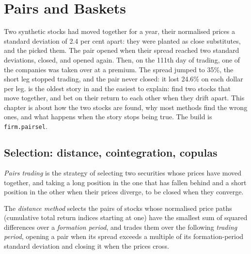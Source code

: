 \chapter{Pairs and Baskets}\label{ch:s1:pairs-and-baskets}

Two synthetic stocks had moved together for a year, their normalised prices a standard deviation of 2.4 per cent apart: they were planted as close
substitutes, and the  picked them. The pair opened when their spread reached two standard deviations, closed, and opened again. Then, on the 111th day of trading, one of the companies was taken over at a premium. The spread jumped to 35\%, the short leg stopped trading, and the pair
never closed: it lost 24.6\% on each dollar per leg.  is the oldest story in  and the easiest to explain: find two stocks
that move together, and bet on their return to each other when they drift apart. This chapter is about how the two stocks are found, why most methods
find the wrong ones, and what happens when the story stops being true. The build is \texttt{firm.pairsel}.

\section{Selection: distance, cointegration, copulas}

\begin{definition}\label{def:s1:pairs-and-baskets:pairs}
\emph{Pairs trading} is the strategy of selecting two securities whose prices have moved together, and taking a long position in the
one that has fallen behind and a short position in the other when their prices diverge, to be closed when they converge.
\end{definition}

\begin{definition}\label{def:s1:pairs-and-baskets:distance}
The \emph{distance method} selects the pairs of stocks whose normalised price paths (cumulative total return indices starting at
one) have the smallest sum of squared differences over a \emph{formation period}, and trades them over the following
\emph{trading period}, opening a pair when its spread exceeds a multiple of its formation-period standard deviation and closing it
when the prices cross.
\end{definition}

